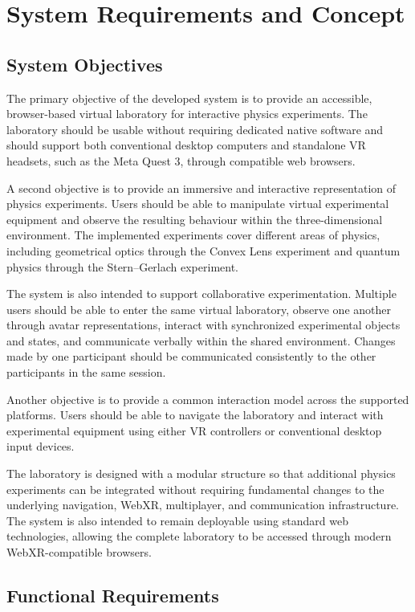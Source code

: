 \chapter{System Requirements and Concept}

\section{System Objectives}

The primary objective of the developed system is to provide an accessible,
browser-based virtual laboratory for interactive physics experiments. The
laboratory should be usable without requiring dedicated native software and
should support both conventional desktop computers and standalone VR headsets,
such as the Meta Quest 3, through compatible web browsers.

A second objective is to provide an immersive and interactive representation
of physics experiments. Users should be able to manipulate virtual experimental
equipment and observe the resulting behaviour within the three-dimensional
environment. The implemented experiments cover different areas of physics,
including geometrical optics through the Convex Lens experiment and quantum
physics through the Stern--Gerlach experiment.

The system is also intended to support collaborative experimentation. Multiple
users should be able to enter the same virtual laboratory, observe one another
through avatar representations, interact with synchronized experimental objects
and states, and communicate verbally within the shared environment. Changes
made by one participant should be communicated consistently to the other
participants in the same session.

Another objective is to provide a common interaction model across the supported
platforms. Users should be able to navigate the laboratory and interact with
experimental equipment using either VR controllers or conventional desktop
input devices.

The laboratory is designed with a modular structure so that additional physics
experiments can be integrated without requiring fundamental changes to the
underlying navigation, WebXR, multiplayer, and communication infrastructure.
The system is also intended to remain deployable using standard web
technologies, allowing the complete laboratory to be accessed through modern
WebXR-compatible browsers.

\section{Functional Requirements}

